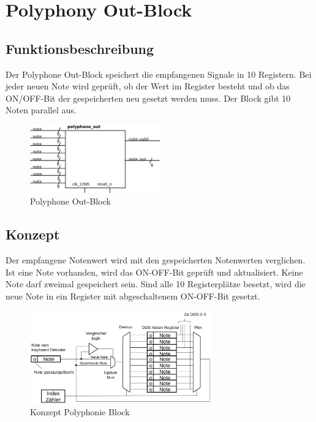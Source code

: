\section{Polyphony Out-Block}\label{sect.polyphonie_umsetzung}
 
\subsection{Funktionsbeschreibung}

Der Polyphone Out-Block speichert die empfangenen Signale in 10 Registern. Bei jeder neuen Note wird geprüft, ob der Wert im Register besteht und ob das ON/OFF-Bit der gespeicherten neu gesetzt werden muss. Der Block gibt 10 Noten parallel aus.

\begin{figure}[H]
	\includegraphics[width=0.5\textwidth]{images/midi_interface/polyphonie_blockschaltbild.png}
	\caption{Polyphone Out-Block}
	\label{fig.polyphnie_out_block}
\end{figure}

\subsection{Konzept}\label{konzept_plyphonie}

Der empfangene Notenwert wird mit den gespeicherten Notenwerten verglichen. Ist eine Note vorhanden, wird das ON-OFF-Bit geprüft und aktualisiert. Keine Note darf zweimal gespeichert sein. Sind alle 10 Registerplätze besetzt, wird die neue Note in ein Register mit abgeschaltenem ON-OFF-Bit gesetzt.

\begin{figure}[H]
	\includegraphics[width=0.7\textwidth]{images/midi_interface/Konzept_Hans_polyphonie.png}
	\caption{Konzept Polyphonie Block \cite{konzept_poly} }
	\label{fig.polyphnie_konzept}
\end{figure}

